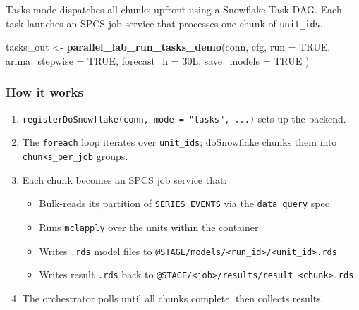 \documentclass[
]{article}
\newenvironment{Shaded}{\begin{snugshade}}{\end{snugshade}}
\newcommand{\AttributeTok}[1]{\textcolor[rgb]{0.13,0.29,0.53}{#1}}
\newcommand{\ConstantTok}[1]{\textcolor[rgb]{0.56,0.35,0.01}{#1}}
\newcommand{\DataTypeTok}[1]{\textcolor[rgb]{0.13,0.29,0.53}{#1}}
\newcommand{\DecValTok}[1]{\textcolor[rgb]{0.00,0.00,0.81}{#1}}
\newcommand{\FunctionTok}[1]{\textcolor[rgb]{0.13,0.29,0.53}{\textbf{#1}}}
\newcommand{\NormalTok}[1]{#1}
\newcommand{\OtherTok}[1]{\textcolor[rgb]{0.56,0.35,0.01}{#1}}
\providecommand{\tightlist}{%
  \setlength{\itemsep}{0pt}\setlength{\parskip}{0pt}}
\begin{document}
Tasks mode dispatches all chunks upfront using a Snowflake Task DAG.
Each task launches an SPCS job service that processes one chunk of
\texttt{unit\_ids}.

\begin{Shaded}
\begin{Highlighting}[]
\NormalTok{tasks\_out }\OtherTok{\textless{}{-}} \FunctionTok{parallel\_lab\_run\_tasks\_demo}\NormalTok{(conn, cfg,}
  \AttributeTok{run            =} \ConstantTok{TRUE}\NormalTok{,}
  \AttributeTok{arima\_stepwise =} \ConstantTok{TRUE}\NormalTok{,}
  \AttributeTok{forecast\_h     =} \DecValTok{30}\DataTypeTok{L}\NormalTok{,}
  \AttributeTok{save\_models    =} \ConstantTok{TRUE}
\NormalTok{)}
\end{Highlighting}
\end{Shaded}

\subsubsection{How it works}\label{how-it-works}

\begin{enumerate}
\def\labelenumi{\arabic{enumi}.}
\tightlist
\item
  \texttt{registerDoSnowflake(conn,\ mode\ =\ "tasks",\ ...)} sets up
  the backend.
\item
  The \texttt{foreach} loop iterates over \texttt{unit\_ids};
  doSnowflake chunks them into \texttt{chunks\_per\_job} groups.
\item
  Each chunk becomes an SPCS job service that:

  \begin{itemize}
  \tightlist
  \item
    Bulk-reads its partition of \texttt{SERIES\_EVENTS} via the
    \texttt{data\_query} spec
  \item
    Runs \texttt{mclapply} over the units within the container
  \item
    Writes \texttt{.rds} model files to
    \texttt{@STAGE/models/\textless{}run\_id\textgreater{}/\textless{}unit\_id\textgreater{}.rds}
  \item
    Writes result \texttt{.rds} back to
    \texttt{@STAGE/\textless{}job\textgreater{}/results/result\_\textless{}chunk\textgreater{}.rds}
  \end{itemize}
\item
  The orchestrator polls until all chunks complete, then collects
  results.
\end{enumerate}
\end{document}
